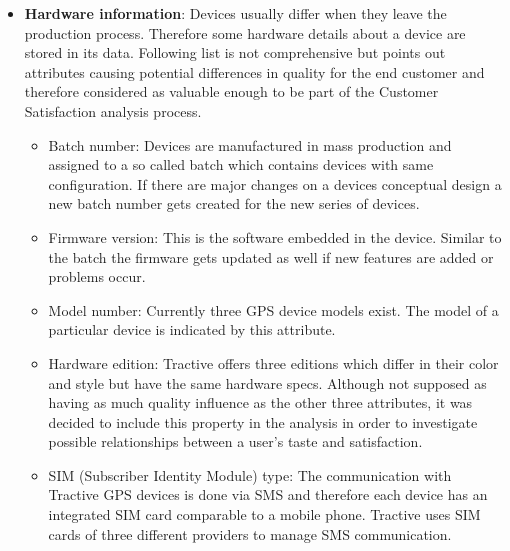 \begin{itemize}
	\item \textbf{Hardware information}: Devices usually differ when they leave the production process. Therefore some hardware details about a device are stored in its data. Following list is not comprehensive but points out attributes causing potential differences in quality for the end customer and therefore considered as valuable enough to be part of the Customer Satisfaction analysis process.
	
	\begin{itemize}
		\item Batch number: Devices are manufactured in mass production and assigned to a so called batch which contains devices with same configuration. If there are major changes on a devices conceptual design a new batch number gets created for the new series of devices. 
		\item Firmware version: This is the software embedded in the device. Similar to the batch the firmware gets updated as well if new features are added or problems occur. 
		\item Model number: Currently three GPS device models exist. The model of a particular device is indicated by this attribute. 
		\item Hardware edition: Tractive offers three editions which differ in their color and style but have the same hardware specs. Although not supposed as having as much quality influence as the other three attributes, it was decided to include this property in the analysis in order to investigate possible relationships between a user's taste and satisfaction. 
		\item SIM (Subscriber Identity Module) type: The communication with Tractive GPS devices is done via SMS and therefore each device has an integrated SIM card comparable to a mobile phone. Tractive uses SIM cards of three different providers to manage SMS communication. 
	\end{itemize}


\end{itemize}
